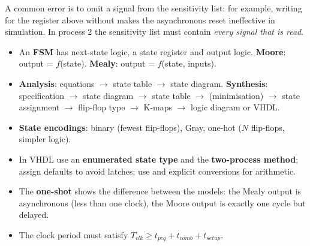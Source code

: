 A common error is to omit a signal from the sensitivity list: for example, writing  for the register above without  makes the asynchronous reset ineffective in simulation. In process 2 the sensitivity list must contain \emph{every signal that is read}.

\begin{chaptersummary}
\begin{itemize}
  \item An \textbf{FSM} has next-state logic, a state register and output logic. \textbf{Moore}: output = $f$(state). \textbf{Mealy}: output = $f$(state, inputs).
  \item \textbf{Analysis}: equations $\to$ state table $\to$ state diagram. \textbf{Synthesis}: specification $\to$ state diagram $\to$ state table $\to$ (minimisation) $\to$ state assignment $\to$ flip-flop type $\to$ K-maps $\to$ logic diagram or VHDL.
  \item \textbf{State encodings}: binary (fewest flip-flops), Gray, one-hot ($N$ flip-flops, simpler logic).
  \item In VHDL use an \textbf{enumerated state type} and the \textbf{two-process method}; assign defaults to avoid latches; use  and explicit conversions for arithmetic.
  \item The \textbf{one-shot} shows the difference between the models: the Mealy output is asynchronous (less than one clock), the Moore output is exactly one cycle but delayed.
  \item The clock period must satisfy $T_{clk}\ge t_{pcq}+t_{comb}+t_{setup}$.
\end{itemize}
\end{chaptersummary}

